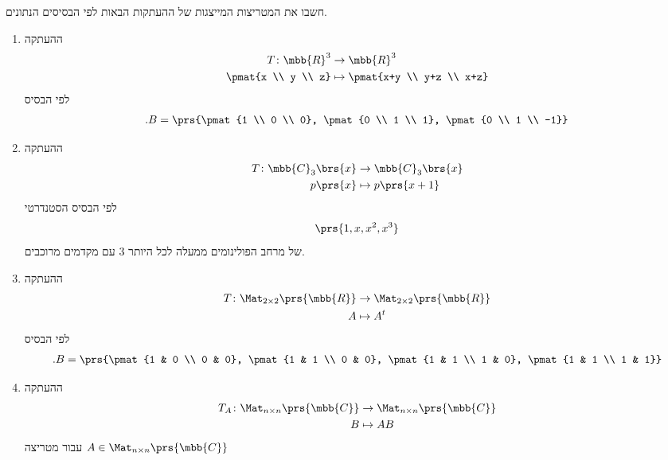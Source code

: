 \documentclass[a4paper,10pt,twoside,openany]{article}
\begin{document}
\begin{exercise}
חשבו את המטריצות המייצגות של ההעתקות הבאות לפי הבסיסים הנתונים.

\begin{enumerate}
\item ההעתקה
\begin{align*}
T \colon \mbb{R}^3 &\to \mbb{R}^3 \\
\pmat{x \\ y \\ z} &\mapsto \pmat{x+y \\ y+z \\ x+z}
\end{align*}
לפי הבסיס
\begin{align*}
\text{.} B = \prs{\pmat{1 \\ 0 \\ 0}, \pmat{0 \\ 1 \\ 1}, \pmat{0 \\ 1 \\ -1}}
\end{align*}
\item ההעתקה
\begin{align*}
T \colon \mbb{C}_3\brs{x} &\to \mbb{C}_3\brs{x} \\
p\prs{x} &\mapsto p\prs{x+1}
\end{align*}
לפי הבסיס הסטנדרטי
\begin{align*}
\prs{1, x, x^2, x^3}
\end{align*}
של מרחב הפולינומים ממעלה לכל היותר
$3$
עם מקדמים מרוכבים.
\item ההעתקה
\begin{align*}
T \colon \Mat_{2\times 2}\prs{\mbb{R}} &\to \Mat_{2 \times 2}\prs{\mbb{R}}\\
A &\mapsto A^t
\end{align*}
לפי הבסיס
\begin{align*}
\text{.} B = \prs{\pmat{1 & 0 \\ 0 & 0}, \pmat{1 & 1 \\ 0 & 0}, \pmat{1 & 1 \\ 1 & 0}, \pmat{1 & 1 \\ 1 & 1}}
\end{align*}
\item ההעתקה
\begin{align*}
T_A \colon \Mat_{n \times n}\prs{\mbb{C}} &\to \Mat_{n \times n}\prs{\mbb{C}} \\
B &\mapsto AB
\end{align*}
עבור מטריצה
$A \in \Mat_{n \times n}\prs{\mbb{C}}$

\end{enumerate}
\end{exercise}
\end{document}

